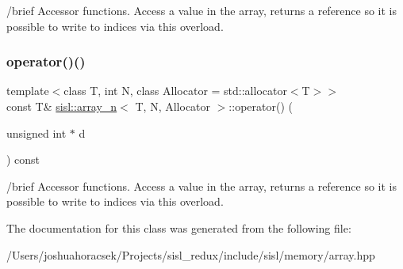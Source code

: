 /brief Accessor functions. Access a value in the array, returns a reference so it is possible to write to indices via this overload. \mbox{\label{classsisl_1_1array__n_a6080746c8b0be2377d391b9cc4c8cf4d}} 
\subsubsection{\texorpdfstring{operator()()}{operator()()}\hspace{0.1cm}{\footnotesize\ttfamily [4/4]}}
{\footnotesize\ttfamily template$<$class T, int N, class Allocator = std\+::allocator$<$\+T$>$$>$ \\
const T\& \hyperlink{classsisl_1_1array__n}{sisl\+::array\+\_\+n}$<$ T, N, Allocator $>$\+::operator() (\begin{DoxyParamCaption}\item[{unsigned int $\ast$}]{d }\end{DoxyParamCaption}) const\hspace{0.3cm}{\ttfamily [inline]}}

/brief Accessor functions. Access a value in the array, returns a reference so it is possible to write to indices via this overload. 

The documentation for this class was generated from the following file\+:\begin{DoxyCompactItemize}
\item 
/\+Users/joshuahoracsek/\+Projects/sisl\+\_\+redux/include/sisl/memory/array.\+hpp\end{DoxyCompactItemize}
